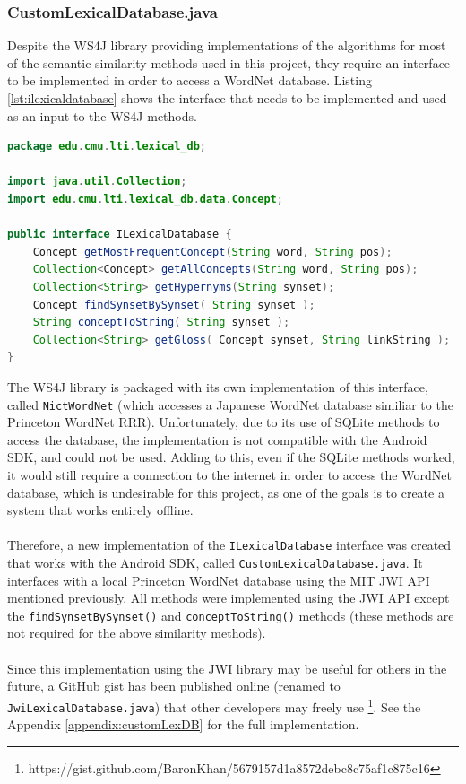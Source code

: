 \documentclass[11pt]{article}
\begin{document}
\subsubsection{CustomLexicalDatabase.java}

Despite the WS4J library providing implementations of the algorithms for most of the semantic similarity methods used in this project, they require an interface to be implemented in order to access a WordNet database. Listing \ref{lst:ilexicaldatabase} shows the interface that needs to be implemented and used as an input to the WS4J methods.

\begin{lstlisting}[language=Java, caption=ILexicalDatabase.java (from the WS4J library), label={lst:ilexicaldatabase}]
package edu.cmu.lti.lexical_db;

import java.util.Collection;
import edu.cmu.lti.lexical_db.data.Concept;

public interface ILexicalDatabase {
	Concept getMostFrequentConcept(String word, String pos);
	Collection<Concept> getAllConcepts(String word, String pos);
	Collection<String> getHypernyms(String synset);
	Concept findSynsetBySynset( String synset );
	String conceptToString( String synset );
	Collection<String> getGloss( Concept synset, String linkString );
}
\end{lstlisting}

The WS4J library is packaged with its own implementation of this interface, called \texttt{NictWordNet} (which accesses a Japanese WordNet database similiar to the Princeton WordNet RRR). Unfortunately, due to its use of SQLite methods to access the database, the implementation is not compatible with the Android SDK, and could not be used. Adding to this, even if the SQLite methods worked, it would still require a connection to the internet in order to access the WordNet database, which is undesirable for this project, as one of the goals is to create a system that works entirely offline.
\\
\\
Therefore, a new implementation of the \texttt{ILexicalDatabase} interface was created that works with the Android SDK, called \texttt{CustomLexicalDatabase.java}. It interfaces with a local Princeton WordNet database using the MIT JWI API mentioned previously. All methods were implemented using the JWI API except the \texttt{findSynsetBySynset()} and \texttt{conceptToString()} methods (these methods are not required for the above similarity methods).
\\
\\
Since this implementation using the JWI library may be useful for others in the future, a GitHub gist has been published online (renamed to \texttt{JwiLexicalDatabase.java}) that other developers may freely use \footnote{https://gist.github.com/BaronKhan/5679157d1a8572debc8c75af1c875c16}. See the Appendix \ref{appendix:customLexDB} for the full implementation.
\end{document}
